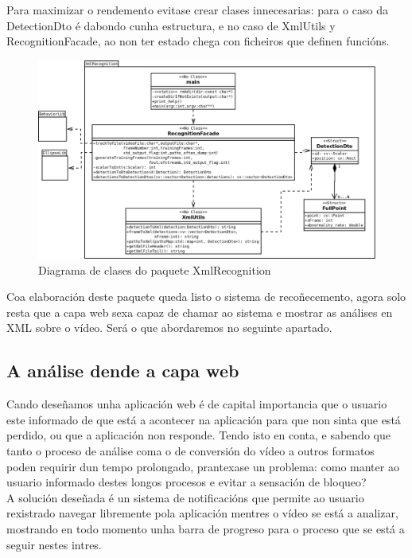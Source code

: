 		Para maximizar o rendemento evitase crear clases innecesarias: para o caso da DetectionDto é dabondo
		cunha estructura, e no caso de XmlUtils y RecognitionFacade, ao non ter estado chega con ficheiros
		que definen funcións.
		
		\begin{figure}[htp]
		\begin{center}
			\includegraphics[scale=0.25]{figures/PaqXmlRecognition.png}
			\caption{Diagrama de clases do paquete XmlRecognition}
		\label{fig:PaqXmlRecognition}
		\end{center}
		\end{figure}
		
		Coa elaboración deste paquete queda listo o sistema de recoñecemento, agora solo resta que a capa web
		sexa capaz de chamar ao sistema e mostrar as análises en XML sobre o vídeo. Será o que abordaremos
		no seguinte apartado.
		
	\subsection{A análise dende a capa web}
	
		Cando deseñamos unha aplicación web é de capital importancia que o usuario este informado de que está
		a acontecer na aplicación para que non sinta que está perdido, ou que a aplicación non responde. Tendo
		isto en conta, e sabendo que tanto o proceso de análise coma o de conversión do vídeo a outros 
		formatos poden requirir dun tempo prolongado, prantexase un problema: como manter ao usuario informado
		destes longos procesos e evitar a sensación de bloqueo?\\
		
		A solución deseñada é un sistema de notificacións que permite ao usuario rexistrado navegar libremente
		pola aplicación mentres o vídeo se está a analizar, mostrando en todo momento unha barra de progreso
		para o proceso que se está a seguir nestes intres.
		
